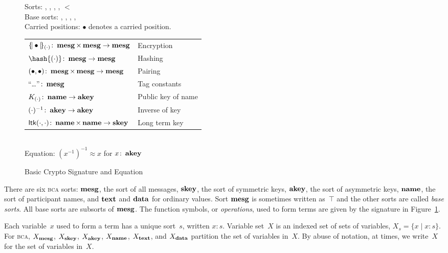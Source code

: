 \documentclass[12pt]{report}
\theoremstyle{definition}
\newcommand{\bca}{\textsc{bca}}
\begin{document}
\begin{figure}
\begin{center}
Sorts: , , , ,  $<$ \\[1ex]
Base sorts: , , , , \\
Carried positions: $\bullet$ denotes a carried position.\\[1ex]
\begin{tabular}{@{}ll}
$\{\!|\bullet|\!\}_{(\cdot)}\colon\operatorname{\mathbf{mesg}}\times\operatorname{\mathbf{mesg}}\rightarrow\operatorname{\mathbf{mesg}}
$&Encryption\\
$\hash{(\cdot)}\colon\dom{mesg}\rightarrow\dom{mesg}
$&Hashing\\
$(\bullet,\bullet)\colon\operatorname{\mathbf{mesg}}\times\operatorname{\mathbf{mesg}}\rightarrow\operatorname{\mathbf{mesg}}$
&Pairing\\
``\ldots''$\colon{}\operatorname{\mathbf{mesg}}$& Tag constants\\
$K_{(\cdot)}\colon\operatorname{\mathbf{name}}\rightarrow\operatorname{\mathbf{akey}}$
&Public key of name\\
$(\cdot)^{-1}\colon\operatorname{\mathbf{akey}}\rightarrow\operatorname{\mathbf{akey}}$
&Inverse of key\\
$\operatorname{\mathsf{ltk}}(\cdot,\cdot)\colon\operatorname{\mathbf{name}}\times\operatorname{\mathbf{name}}\rightarrow\operatorname{\mathbf{skey}}$
& Long term key
\end{tabular}\\[1ex]
Equation: $(x^{-1})^{-1} \approx x$ for $x\colon\operatorname{\mathbf{akey}}$
\end{center}
\caption{Basic Crypto Signature and Equation}\label{fig:bcs}
\end{figure}

There are six {\bca} sorts: $\operatorname{\mathbf{mesg}}$, the sort of
all messages, $\operatorname{\mathbf{skey}}$, the sort of symmetric keys,
$\operatorname{\mathbf{akey}}$, the sort of asymmetric keys, $\operatorname{\mathbf{name}}$, the sort of
participant names, and $\operatorname{\mathbf{text}}$ and $\operatorname{\mathbf{data}}$ for ordinary
values.  Sort $\operatorname{\mathbf{mesg}}$ is sometimes written as~$\top$ and the
other sorts are called \emph{base sorts}.
All base sorts are subsorts of $\operatorname{\mathbf{mesg}}$.  The function
symbols, or \emph{operations}, used to form terms
are given by the signature in Figure~\ref{fig:bcs}.

Each variable~$x$ used to form a term has a unique sort~$s$, written
$x\colon s$.  Variable set~$X$ is an indexed set
of sets of variables, $X_s=\{x\mid x\colon s\}$.  For {\bca},
$X_{\operatorname{\mathbf{mesg}}}$, $X_{\operatorname{\mathbf{skey}}}$, $X_{\operatorname{\mathbf{akey}}}$,
$X_{\operatorname{\mathbf{name}}}$, $X_{\operatorname{\mathbf{text}}}$, and $X_{\operatorname{\mathbf{data}}}$ partition
the set of variables in~$X$.  By abuse of notation, at times, we
write~$X$ for the set of variables in~$X$.
\end{document}
